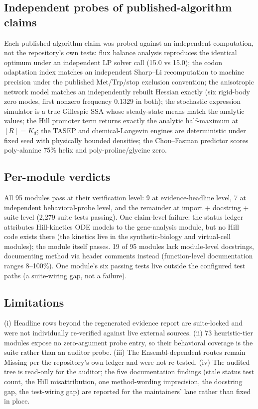 \subsection{Independent probes of published-algorithm claims}
Each published-algorithm claim was probed against an independent computation, not the repository's own tests: flux balance analysis reproduces the identical optimum under an independent LP solver call (15.0 vs 15.0); the codon adaptation index matches an independent Sharp--Li recomputation to machine precision under the published Met/Trp/stop exclusion convention; the anisotropic network model matches an independently rebuilt Hessian exactly (six rigid-body zero modes, first nonzero frequency 0.1329 in both); the stochastic expression simulator is a true Gillespie SSA whose steady-state means match the analytic values; the Hill promoter term returns exactly the analytic half-maximum at $[R]=K_d$; the TASEP and chemical-Langevin engines are deterministic under fixed seed with physically bounded densities; the Chou--Fasman predictor scores poly-alanine 75\% helix and poly-proline/glycine zero.
\subsection{Per-module verdicts}
All 95 modules pass at their verification level: 9 at evidence-headline level, 7 at independent behavioral-probe level, and the remainder at import + docstring + suite level (2,279 suite tests passing). One claim-level failure: the status ledger attributes Hill-kinetics ODE models to the gene-analysis module, but no Hill code exists there (the kinetics live in the synthetic-biology and virtual-cell modules); the module itself passes. 19 of 95 modules lack module-level docstrings, documenting method via header comments instead (function-level documentation ranges 8--100\%). One module's six passing tests live outside the configured test paths (a suite-wiring gap, not a failure).
\subsection{Limitations}
(i) Headline rows beyond the regenerated evidence report are suite-locked and were not individually re-verified against live external sources. (ii) 73 heuristic-tier modules expose no zero-argument probe entry, so their behavioral coverage is the suite rather than an auditor probe. (iii) The Ensembl-dependent routes remain Missing per the repository's own ledger and were not re-tested. (iv) The audited tree is read-only for the auditor; the five documentation findings (stale status test count, the Hill misattribution, one method-wording imprecision, the docstring gap, the test-wiring gap) are reported for the maintainers' lane rather than fixed in place.

